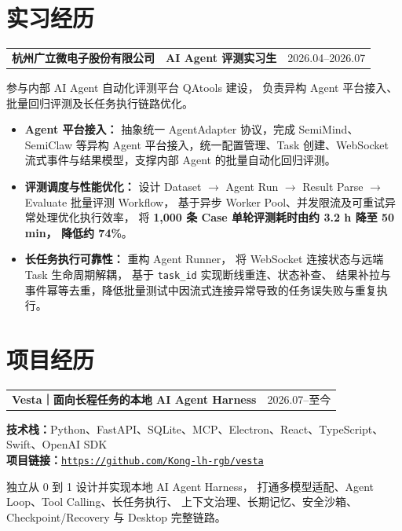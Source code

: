 \documentclass[a4paper,8pt]{article}
\makeatletter
\newcommand{\resumeItem}[1]{\item #1}
\newcommand{\experienceTitle}[3]{%
    \begin{tabularx}{\textwidth}{
        @{}
        >{\raggedright\arraybackslash}p{0.40\textwidth}
        >{\centering\arraybackslash}p{0.36\textwidth}
        >{\raggedleft\arraybackslash}p{0.24\textwidth}
        @{}
    }
        \textbf{\large #1}
        &
        \textbf{#2}
        &
        \textcolor{muted}{#3}
    \end{tabularx}
}
\newcommand{\projectTitle}[4]{%
    \begin{tabularx}{\textwidth}{
        @{}
        >{\raggedright\arraybackslash}X
        >{\raggedleft\arraybackslash}p{0.18\textwidth}
        @{}
    }
        \textbf{\large #1}
        &
        \textcolor{muted}{#2}
    \end{tabularx}

    \vspace{1.5pt}

    \textbf{技术栈：}#3\\[1pt]
    \textbf{项目链接：}\href{#4}{\nolinkurl{#4}}
}
\makeatother
\begin{document}

\section{实习经历}

\experienceTitle
{杭州广立微电子股份有限公司}
{AI Agent 评测实习生}
{2026.04--2026.07}

\vspace{-8pt}

参与内部 AI Agent 自动化评测平台 QAtools 建设，
负责异构 Agent 平台接入、批量回归评测及长任务执行链路优化。

\begin{itemize}

\resumeItem{
    \textbf{Agent 平台接入：}
    抽象统一 AgentAdapter 协议，完成 SemiMind、SemiClaw 等异构 Agent 平台接入，统一配置管理、Task 创建、WebSocket 流式事件与结果模型，支撑内部 Agent 的批量自动化回归评测。
}

\resumeItem{
    \textbf{评测调度与性能优化：}
    设计 Dataset $\rightarrow$ Agent Run $\rightarrow$
    Result Parse $\rightarrow$ Evaluate 批量评测 Workflow，
    基于异步 Worker Pool、并发限流及可重试异常处理优化执行效率，
    将 \textbf{1,000 条 Case 单轮评测耗时由约 3.2 h 降至 50 min，
    降低约 74\%}。
}

\resumeItem{
    \textbf{长任务执行可靠性：}
    重构 Agent Runner，
    将 WebSocket 连接状态与远端 Task 生命周期解耦，
    基于 \texttt{task\_id} 实现断线重连、状态补查、
    结果补拉与事件幂等去重，降低批量测试中因流式连接异常导致的任务误失败与重复执行。
}

\end{itemize}


\section{项目经历}

\projectTitle
{Vesta｜面向长程任务的本地 AI Agent Harness}
{2026.07--至今}
{Python、FastAPI、SQLite、MCP、Electron、React、TypeScript、Swift、OpenAI SDK}
{https://github.com/Kong-lh-rgb/vesta}

\vspace{1pt}

独立从 0 到 1 设计并实现本地 AI Agent Harness，
打通多模型适配、Agent Loop、Tool Calling、长任务执行、
上下文治理、长期记忆、安全沙箱、Checkpoint/Recovery 与 Desktop 完整链路。
\end{document}
